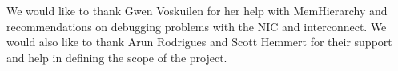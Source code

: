 We would like to thank Gwen Voskuilen for her help with MemHierarchy
and recommendations on debugging problems with the NIC and
interconnect. We would also like to thank Arun Rodrigues and 
Scott Hemmert for their support and help in defining the scope of the project.

